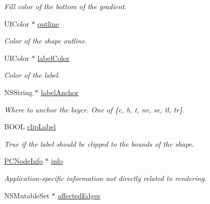 \begin{Indent}
\begin{DoxyCompactItemize}
\begin{DoxyCompactList}\small\item\em Fill color of the bottom of the gradient. \end{DoxyCompactList}\item 
\hypertarget{interface_p_c_graph_node_ac8c42c6a8d46f97470f45682e99817e3}{
UIColor $\ast$ \hyperlink{interface_p_c_graph_node_ac8c42c6a8d46f97470f45682e99817e3}{outline}}
\label{interface_p_c_graph_node_ac8c42c6a8d46f97470f45682e99817e3}

\begin{DoxyCompactList}\small\item\em Color of the shape outline. \end{DoxyCompactList}\item 
\hypertarget{interface_p_c_graph_node_af7555d26523b2170395595a0d97d8af8}{
UIColor $\ast$ \hyperlink{interface_p_c_graph_node_af7555d26523b2170395595a0d97d8af8}{labelColor}}
\label{interface_p_c_graph_node_af7555d26523b2170395595a0d97d8af8}

\begin{DoxyCompactList}\small\item\em Color of the label. \end{DoxyCompactList}\item 
\hypertarget{interface_p_c_graph_node_a299e0c3624dc809e5fc218a4756a3bcf}{
NSString $\ast$ \hyperlink{interface_p_c_graph_node_a299e0c3624dc809e5fc218a4756a3bcf}{labelAnchor}}
\label{interface_p_c_graph_node_a299e0c3624dc809e5fc218a4756a3bcf}

\begin{DoxyCompactList}\small\item\em Where to anchor the layer. One of \{c, b, t, ne, se, tl, tr\}. \end{DoxyCompactList}\item 
BOOL \hyperlink{interface_p_c_graph_node_a76c958b98811dfd4e49955d253859f10}{clipLabel}
\begin{DoxyCompactList}\small\item\em True if the label should be clipped to the bounds of the shape. \end{DoxyCompactList}\item 
\hypertarget{interface_p_c_graph_node_aa1afa765662959eb26096bf730a86c58}{
\hyperlink{interface_p_c_node_info}{PCNodeInfo} $\ast$ \hyperlink{interface_p_c_graph_node_aa1afa765662959eb26096bf730a86c58}{info}}
\label{interface_p_c_graph_node_aa1afa765662959eb26096bf730a86c58}

\begin{DoxyCompactList}\small\item\em Application-\/specific information not directly related to rendering. \end{DoxyCompactList}\item 
\hypertarget{interface_p_c_graph_node_aae73a008e2419a34d5b380941f307a53}{
NSMutableSet $\ast$ \hyperlink{interface_p_c_graph_node_aae73a008e2419a34d5b380941f307a53}{affectedEdges}}
\label{interface_p_c_graph_node_aae73a008e2419a34d5b380941f307a53}


\end{DoxyCompactItemize}
\end{Indent}
